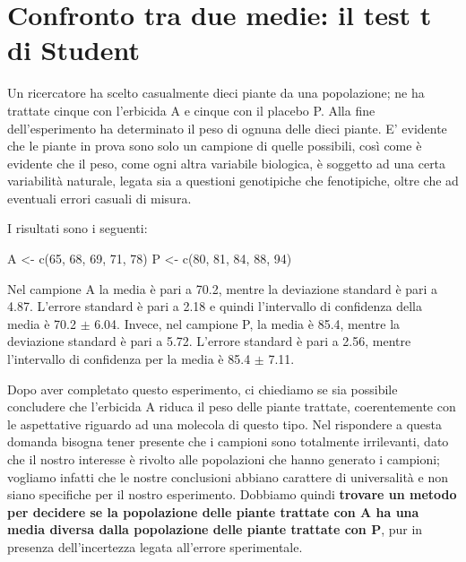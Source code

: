 \documentclass[a4paper,12pt,oneside]{book}
\newenvironment{Shaded}{\begin{snugshade}}{\end{snugshade}}
\newcommand{\DecValTok}[1]{#1}
\newcommand{\OtherTok}[1]{#1}
\newcommand{\FunctionTok}[1]{#1}
\newcommand{\NormalTok}[1]{#1}
\begin{document}
\hypertarget{confronto-tra-due-medie-il-test-t-di-student}{%
\section{Confronto tra due medie: il test t di Student}\label{confronto-tra-due-medie-il-test-t-di-student}}

Un ricercatore ha scelto casualmente dieci piante da una popolazione; ne ha trattate cinque con l'erbicida A e cinque con il placebo P. Alla fine dell'esperimento ha determinato il peso di ognuna delle dieci piante. E' evidente che le piante in prova sono solo un campione di quelle possibili, così come è evidente che il peso, come ogni altra variabile biologica, è soggetto ad una certa variabilità naturale, legata sia a questioni genotipiche che fenotipiche, oltre che ad eventuali errori casuali di misura.

I risultati sono i seguenti:

\begin{Shaded}
\begin{Highlighting}[]
\NormalTok{A }\OtherTok{\textless{}{-}} \FunctionTok{c}\NormalTok{(}\DecValTok{65}\NormalTok{, }\DecValTok{68}\NormalTok{, }\DecValTok{69}\NormalTok{, }\DecValTok{71}\NormalTok{, }\DecValTok{78}\NormalTok{)}
\NormalTok{P }\OtherTok{\textless{}{-}} \FunctionTok{c}\NormalTok{(}\DecValTok{80}\NormalTok{, }\DecValTok{81}\NormalTok{, }\DecValTok{84}\NormalTok{, }\DecValTok{88}\NormalTok{, }\DecValTok{94}\NormalTok{)}
\end{Highlighting}
\end{Shaded}

Nel campione A la media è pari a 70.2, mentre la deviazione standard è pari a 4.87. L'errore standard è pari a 2.18 e quindi l'intervallo di confidenza della media è 70.2 \(\pm\) 6.04. Invece, nel campione P, la media è 85.4, mentre la deviazione standard è pari a 5.72. L'errore standard è pari a 2.56, mentre l'intervallo di confidenza per la media è 85.4 \(\pm\) 7.11.

Dopo aver completato questo esperimento, ci chiediamo se sia possibile concludere che l'erbicida A riduca il peso delle piante trattate, coerentemente con le aspettative riguardo ad una molecola di questo tipo. Nel rispondere a questa domanda bisogna tener presente che i campioni sono totalmente irrilevanti, dato che il nostro interesse è rivolto alle popolazioni che hanno generato i campioni; vogliamo infatti che le nostre conclusioni abbiano carattere di universalità e non siano specifiche per il nostro esperimento. Dobbiamo quindi \textbf{trovare un metodo per decidere se la popolazione delle piante trattate con A ha una media diversa dalla popolazione delle piante trattate con P}, pur in presenza dell'incertezza legata all'errore sperimentale.
\end{document}
